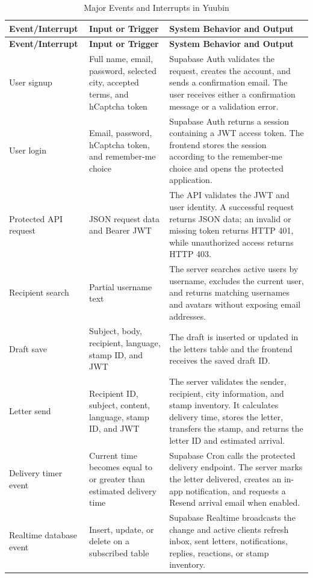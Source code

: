 ﻿\documentclass[12pt,a4paper]{report}
\begin{document}
\begin{longtable}{p{3.2cm} p{4cm} p{6.5cm}}
\caption{Major Events and Interrupts in Yuubin}
\label{tab:behavior_events}\\
\toprule
\textbf{Event/Interrupt} & \textbf{Input or Trigger} & \textbf{System Behavior and Output} \\
\midrule
\endfirsthead
\toprule
\textbf{Event/Interrupt} & \textbf{Input or Trigger} & \textbf{System Behavior and Output} \\
\midrule
\endhead
User signup & Full name, email, password, selected city, accepted terms, and hCaptcha token & Supabase Auth validates the request, creates the account, and sends a confirmation email. The user receives either a confirmation message or a validation error. \\
User login & Email, password, hCaptcha token, and remember-me choice & Supabase Auth returns a session containing a JWT access token. The frontend stores the session according to the remember-me choice and opens the protected application. \\
Protected API request & JSON request data and Bearer JWT & The API validates the JWT and user identity. A successful request returns JSON data; an invalid or missing token returns HTTP 401, while unauthorized access returns HTTP 403. \\
Recipient search & Partial username text & The server searches active users by username, excludes the current user, and returns matching usernames and avatars without exposing email addresses. \\
Draft save & Subject, body, recipient, language, stamp ID, and JWT & The draft is inserted or updated in the letters table and the frontend receives the saved draft ID. \\
Letter send & Recipient ID, subject, content, language, stamp ID, and JWT & The server validates the sender, recipient, city information, and stamp inventory. It calculates delivery time, stores the letter, transfers the stamp, and returns the letter ID and estimated arrival. \\
Delivery timer event & Current time becomes equal to or greater than estimated delivery time & Supabase Cron calls the protected delivery endpoint. The server marks the letter delivered, creates an in-app notification, and requests a Resend arrival email when enabled. \\
Realtime database event & Insert, update, or delete on a subscribed table & Supabase Realtime broadcasts the change and active clients refresh inbox, sent letters, notifications, replies, reactions, or stamp inventory. \\

\end{longtable}
\end{document}
